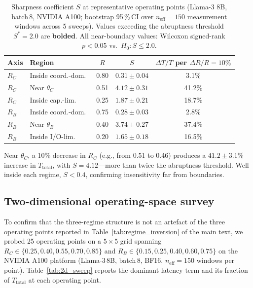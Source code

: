 \begin{table}[h]
\centering
\caption{Sharpness coefficient $S$ at representative operating points
(Llama-3 8B, batch\,8, NVIDIA A100; bootstrap 95\,\%\,CI over
$n_{\mathrm{eff}}{=}150$ measurement windows across 5 sweeps).
Values exceeding the abruptness threshold $S^*{=}2.0$ are \textbf{bolded}.
All near-boundary values: Wilcoxon signed-rank $p < 0.05$ vs.\ $H_0{:}S\leq2.0$.}
\label{tab:sharpness}
\renewcommand{\arraystretch}{1.2}
\begin{tabular}{llccc}
\toprule
\textbf{Axis} & \textbf{Region} & $R$ & $S$ & $\Delta T/T$ per $\Delta R/R{=}10\%$ \\
\midrule
$R_C$ & Inside coord.-dom.\ & 0.80 & $0.31 \pm 0.04$ & 3.1\% \\
$R_C$ & Near $\theta_C$      & 0.51 & $\mathbf{4.12 \pm 0.31}$ & 41.2\% \\
$R_C$ & Inside cap.-lim.\   & 0.25 & $1.87 \pm 0.21$ & 18.7\% \\
\midrule
$R_B$ & Inside coord.-dom.\ & 0.75 & $0.28 \pm 0.03$ & 2.8\% \\
$R_B$ & Near $\theta_B$      & 0.40 & $\mathbf{3.74 \pm 0.27}$ & 37.4\% \\
$R_B$ & Inside I/O-lim.\    & 0.20 & $1.65 \pm 0.18$ & 16.5\% \\
\bottomrule
\end{tabular}
\end{table}

Near $\theta_C$, a 10\% decrease in $R_C$ (e.g., from 0.51 to 0.46)
produces a $41.2 \pm 3.1\%$ increase in $T_{\mathrm{total}}$, with
$S = 4.12$---more than twice the abruptness threshold.
Well inside each regime, $S < 0.4$, confirming insensitivity far from
boundaries.

\subsection{Two-dimensional operating-space survey}
\label{app:2d_sweep}

To confirm that the three-regime structure is not an artefact of the three
operating points reported in Table~\ref{tab:regime_inversion} of the main text,
we probed 25 operating points on a $5 \times 5$ grid spanning
$R_C \in \{0.25, 0.40, 0.55, 0.70, 0.85\}$ and
$R_B \in \{0.15, 0.25, 0.40, 0.60, 0.75\}$
on the NVIDIA A100 platform (Llama-3\,8B, batch\,8, BF16,
$n_{\mathrm{eff}}\!=\!150$ windows per point).
Table~\ref{tab:2d_sweep} reports the dominant latency term and its fraction of
$T_{\mathrm{total}}$ at each operating point.

